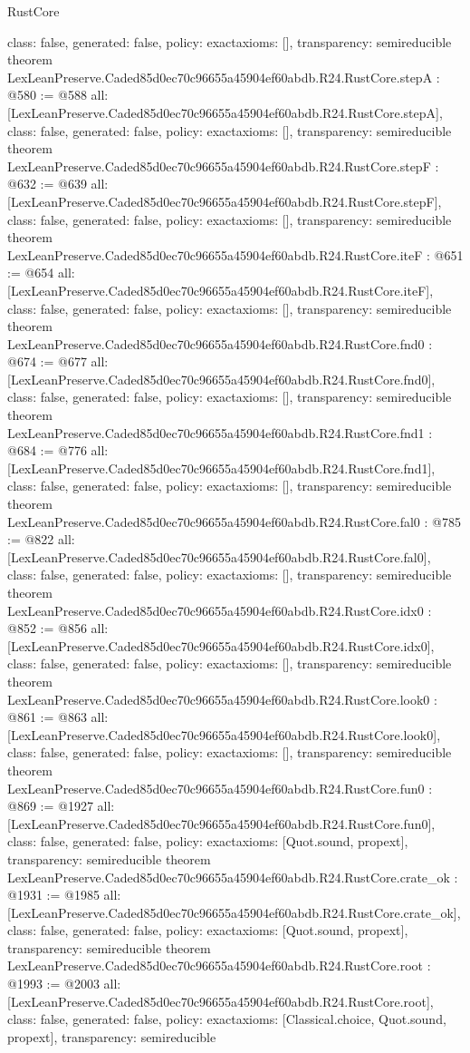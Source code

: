 \begin{lexlean}{RustCore}
\begin{coremodule}
{  class: false,
  generated: false,
  policy: exact{axioms: []},
  transparency: semireducible
}
theorem LexLeanPreserve.Caded85d0ec70c96655a45904ef60abdb.R24.RustCore.stepA : @580 := @588 {
  all: [LexLeanPreserve.Caded85d0ec70c96655a45904ef60abdb.R24.RustCore.stepA],
  class: false,
  generated: false,
  policy: exact{axioms: []},
  transparency: semireducible
}
theorem LexLeanPreserve.Caded85d0ec70c96655a45904ef60abdb.R24.RustCore.stepF : @632 := @639 {
  all: [LexLeanPreserve.Caded85d0ec70c96655a45904ef60abdb.R24.RustCore.stepF],
  class: false,
  generated: false,
  policy: exact{axioms: []},
  transparency: semireducible
}
theorem LexLeanPreserve.Caded85d0ec70c96655a45904ef60abdb.R24.RustCore.iteF : @651 := @654 {
  all: [LexLeanPreserve.Caded85d0ec70c96655a45904ef60abdb.R24.RustCore.iteF],
  class: false,
  generated: false,
  policy: exact{axioms: []},
  transparency: semireducible
}
theorem LexLeanPreserve.Caded85d0ec70c96655a45904ef60abdb.R24.RustCore.fnd0 : @674 := @677 {
  all: [LexLeanPreserve.Caded85d0ec70c96655a45904ef60abdb.R24.RustCore.fnd0],
  class: false,
  generated: false,
  policy: exact{axioms: []},
  transparency: semireducible
}
theorem LexLeanPreserve.Caded85d0ec70c96655a45904ef60abdb.R24.RustCore.fnd1 : @684 := @776 {
  all: [LexLeanPreserve.Caded85d0ec70c96655a45904ef60abdb.R24.RustCore.fnd1],
  class: false,
  generated: false,
  policy: exact{axioms: []},
  transparency: semireducible
}
theorem LexLeanPreserve.Caded85d0ec70c96655a45904ef60abdb.R24.RustCore.fal0 : @785 := @822 {
  all: [LexLeanPreserve.Caded85d0ec70c96655a45904ef60abdb.R24.RustCore.fal0],
  class: false,
  generated: false,
  policy: exact{axioms: []},
  transparency: semireducible
}
theorem LexLeanPreserve.Caded85d0ec70c96655a45904ef60abdb.R24.RustCore.idx0 : @852 := @856 {
  all: [LexLeanPreserve.Caded85d0ec70c96655a45904ef60abdb.R24.RustCore.idx0],
  class: false,
  generated: false,
  policy: exact{axioms: []},
  transparency: semireducible
}
theorem LexLeanPreserve.Caded85d0ec70c96655a45904ef60abdb.R24.RustCore.look0 : @861 := @863 {
  all: [LexLeanPreserve.Caded85d0ec70c96655a45904ef60abdb.R24.RustCore.look0],
  class: false,
  generated: false,
  policy: exact{axioms: []},
  transparency: semireducible
}
theorem LexLeanPreserve.Caded85d0ec70c96655a45904ef60abdb.R24.RustCore.fun0 : @869 := @1927 {
  all: [LexLeanPreserve.Caded85d0ec70c96655a45904ef60abdb.R24.RustCore.fun0],
  class: false,
  generated: false,
  policy: exact{axioms: [Quot.sound, propext]},
  transparency: semireducible
}
theorem LexLeanPreserve.Caded85d0ec70c96655a45904ef60abdb.R24.RustCore.crate_ok : @1931 := @1985 {
  all: [LexLeanPreserve.Caded85d0ec70c96655a45904ef60abdb.R24.RustCore.crate_ok],
  class: false,
  generated: false,
  policy: exact{axioms: [Quot.sound, propext]},
  transparency: semireducible
}
theorem LexLeanPreserve.Caded85d0ec70c96655a45904ef60abdb.R24.RustCore.root : @1993 := @2003 {
  all: [LexLeanPreserve.Caded85d0ec70c96655a45904ef60abdb.R24.RustCore.root],
  class: false,
  generated: false,
  policy: exact{axioms: [Classical.choice, Quot.sound, propext]},
  transparency: semireducible
}


\end{coremodule}
\end{lexlean}
